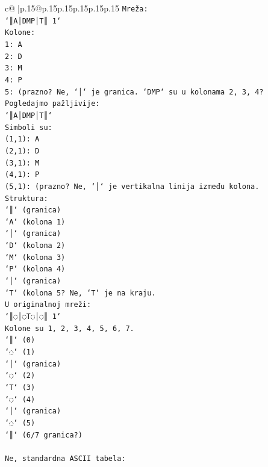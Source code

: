 \documentclass{article}
\begin{document}
{\begin{supertabular}{c@{$\;$}|p{.15\linewidth}@{}p{.15\linewidth}p{.15\linewidth}p{.15\linewidth}p{.15\linewidth}p{.15\linewidth}}
{{{\texttt{Mreža:} \\
\texttt{`║A│DMP│T║ 1`} \\
\texttt{Kolonе:} \\
\texttt{1: A} \\
\texttt{2: D} \\
\texttt{3: M} \\
\texttt{4: P} \\
\texttt{5: (prazno? Ne, `│` je granica. `DMP` su u kolonama 2, 3, 4?} \\
\texttt{Pogledajmo pažljivije:} \\
\texttt{`║A│DMP│T║`} \\
\texttt{Simboli su:} \\
\texttt{(1,1): A} \\
\texttt{(2,1): D} \\
\texttt{(3,1): M} \\
\texttt{(4,1): P} \\
\texttt{(5,1): (prazno? Ne, `│` je vertikalna linija između kolona.} \\
\texttt{Struktura:} \\
\texttt{`║` (granica)} \\
\texttt{`A` (kolona 1)} \\
\texttt{`│` (granica)} \\
\texttt{`D` (kolona 2)} \\
\texttt{`M` (kolona 3)} \\
\texttt{`P` (kolona 4)} \\
\texttt{`│` (granica)} \\
\texttt{`T` (kolona 5? Ne, `T` je na kraju.} \\
\texttt{U originalnoj mreži:} \\
\texttt{`║◌│◌T◌│◌║ 1`} \\
\texttt{Kolonе su 1, 2, 3, 4, 5, 6, 7.} \\
\texttt{`║` (0)} \\
\texttt{`◌` (1)} \\
\texttt{`│` (granica)} \\
\texttt{`◌` (2)} \\
\texttt{`T` (3)} \\
\texttt{`◌` (4)} \\
\texttt{`│` (granica)} \\
\texttt{`◌` (5)} \\
\texttt{`║` (6/7 granica?)} \\
\\ 
\texttt{Ne, standardna ASCII tabela:} \\
}}}
\end{supertabular}}
\end{document}

